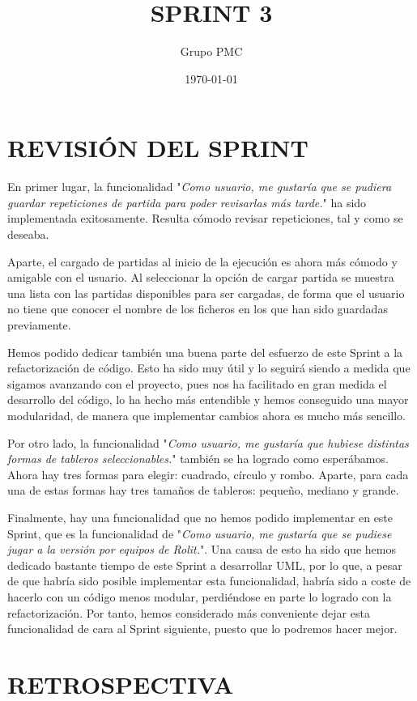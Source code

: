 \documentclass{article}
\title{SPRINT 3}
\date{\today}
\author{Grupo PMC}
\begin{document}
\maketitle
\section{REVISIÓN DEL SPRINT}
En primer lugar, la funcionalidad "\textit{Como usuario, me gustaría que se pudiera guardar repeticiones de partida para poder revisarlas más tarde.}" ha sido implementada exitosamente. Resulta cómodo revisar repeticiones, tal y como se deseaba.

Aparte, el cargado de partidas al inicio de la ejecución es ahora más cómodo y amigable con el usuario. Al seleccionar la opción de cargar partida se muestra una lista con las partidas disponibles para ser cargadas, de forma que el usuario no tiene que conocer el nombre de los ficheros en los que han sido guardadas previamente.

Hemos podido dedicar también una buena parte del esfuerzo de este Sprint a la refactorización de código. Esto ha sido muy útil y lo seguirá siendo a medida que sigamos avanzando con el proyecto, pues nos ha facilitado en gran medida el desarrollo del código, lo ha hecho más entendible y hemos conseguido una mayor modularidad, de manera que implementar cambios ahora es mucho más sencillo.

Por otro lado, la funcionalidad "\textit{Como usuario, me gustaría que hubiese distintas formas de tableros seleccionables.}" también se ha logrado como esperábamos. Ahora hay tres formas para elegir: cuadrado, círculo y rombo. Aparte, para cada una de estas formas hay tres tamaños de tableros: pequeño, mediano y grande.

Finalmente, hay una funcionalidad que no hemos podido implementar en este Sprint, que es la funcionalidad de "\textit{Como usuario, me  gustaría que se pudiese jugar a la versión por equipos de Rolit.}". Una causa de esto ha sido que hemos dedicado bastante tiempo de este Sprint a desarrollar UML, por lo que, a pesar de que habría sido posible implementar esta funcionalidad, habría sido a coste de hacerlo con un código menos modular, perdiéndose en parte lo logrado con la refactorización. Por tanto, hemos considerado más conveniente dejar esta funcionalidad de cara al Sprint siguiente, puesto que lo podremos hacer mejor.

\section{RETROSPECTIVA}
\end{document}
